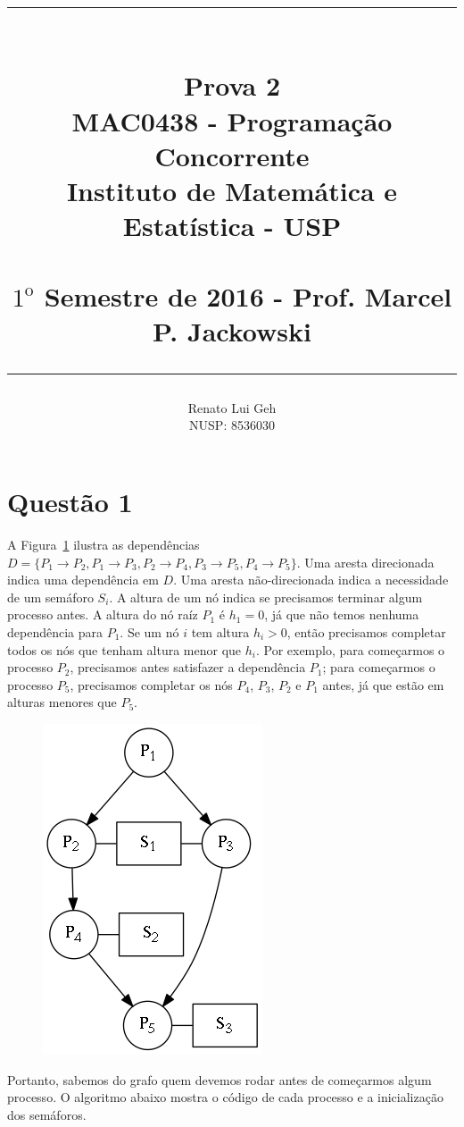 \documentclass{amsart}
\title{%
  \noindent\rule{10cm}{0.8pt}\\
  Prova 2\\[1ex]
  \scriptsize\mdseries
  MAC0438 - Programação Concorrente\\
  Instituto de Matemática e Estatística - USP\\%
  \tiny~\\
  $1^\text{o}$ Semestre de 2016 - Prof. Marcel P. Jackowski\\%
  \noindent\rule{10cm}{0.8pt}
}
\author[]{Renato Lui Geh\\NUSP\@: 8536030}
\theoremstyle{plain}
\numberwithin{equation}{section}
\begin{document}
\maketitle

\section*{Questão 1}

A Figura~\ref{ex1-fig} ilustra as dependências $D=\{P_1\to P_2, P_1\to P_3, P_2\to P_4, P_3\to
P_5, P_4\to P_5\}$. Uma aresta direcionada indica uma dependência em $D$. Uma aresta
não-direcionada indica a necessidade de um semáforo $S_i$. A altura de um nó indica se precisamos
terminar algum processo antes. A altura do nó raíz $P_1$ é $h_1=0$, já que não temos nenhuma
dependência para $P_1$. Se um nó $i$ tem altura $h_i>0$, então precisamos completar todos os nós
que tenham altura menor que $h_i$. Por exemplo, para começarmos o processo $P_2$, precisamos
antes satisfazer a dependência $P_1$; para começarmos o processo $P_5$, precisamos completar os
nós $P_4$, $P_3$, $P_2$ e $P_1$ antes, já que estão em alturas menores que $P_5$.

\begin{figure}[h]
  \centering\includegraphics[scale=0.4]{graphs/ex1.png}
  \caption{}\label{ex1-fig}
\end{figure}

Portanto, sabemos do grafo quem devemos rodar antes de começarmos algum processo. O algoritmo
abaixo mostra o código de cada processo e a inicialização dos semáforos.
\end{document}
